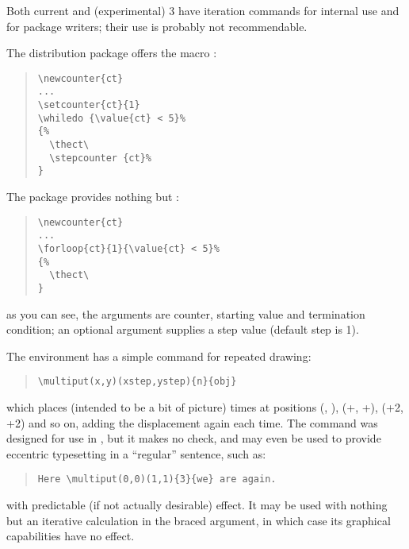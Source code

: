 %
Both current \latex{} and (experimental) \latex{}3 have iteration
commands for internal use and for package writers; their use is
probably not recommendable.

The \latex{} distribution package  offers the macro
:
\begin{quote}
\begin{verbatim}
\newcounter{ct}
...
\setcounter{ct}{1}
\whiledo {\value{ct} < 5}%
{%
  \thect\
  \stepcounter {ct}%
}
\end{verbatim}
\end{quote}

The  package provides nothing but :
\begin{quote}
\begin{verbatim}
\newcounter{ct}
...
\forloop{ct}{1}{\value{ct} < 5}%
{%
  \thect\
}
\end{verbatim}
\end{quote}
as you can see, the arguments are counter, starting value and
termination condition; an optional argument supplies a step value
(default step is 1).

The \latex{}  environment has a simple command
for repeated drawing:
\begin{quote}
\begin{verbatim}
\multiput(x,y)(xstep,ystep){n}{obj}
\end{verbatim}
\end{quote}
which places  (intended to be a bit of picture)
\meta{n} times at positions (, ),
(\meta{x}+, \meta{y}+),
(\meta{x}+2\meta{xstep}, \meta{y}+2\meta{ystep}) and so on, adding the
displacement again each time.  The command was designed for use in
\environment{picture}, but it makes no check, and may even be used to
provide eccentric typesetting in a ``regular'' sentence, such as:
\begin{quote}
\begin{verbatim}
Here \multiput(0,0)(1,1){3}{we} are again.
\end{verbatim}
\end{quote}
with predictable (if not actually desirable) effect.  It may be used
with nothing but an iterative calculation in the braced argument, in
which case its graphical capabilities have no effect.

